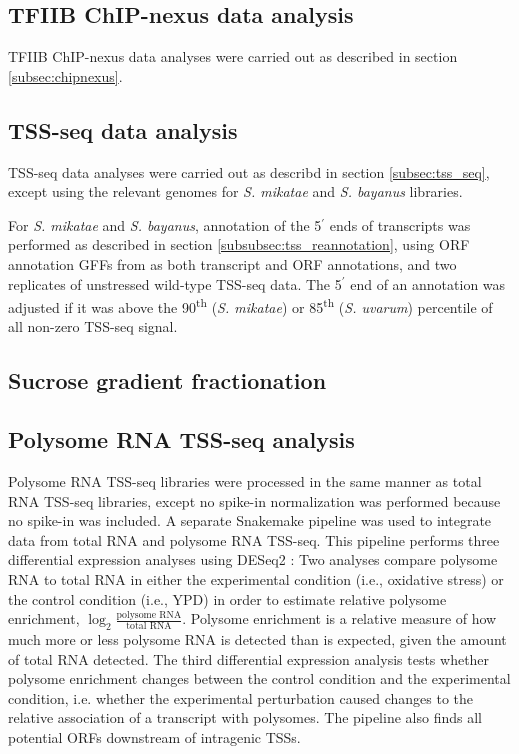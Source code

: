 \subsection{TFIIB ChIP-nexus data analysis}

TFIIB ChIP-nexus data analyses were carried out as described in section \ref{subsec:chipnexus}.

\subsection{TSS-seq data analysis}

TSS-seq data analyses were carried out as describd in section \ref{subsec:tss_seq}, except using the relevant genomes for \textit{S. mikatae} and \textit{S. bayanus} libraries.

For \textit{S. mikatae} and \textit{S. bayanus}, annotation of the 5$^\prime$ ends of transcripts was performed as described in section \ref{subsubsec:tss_reannotation}, using ORF annotation GFFs from \citet{scannell11} as both transcript and ORF annotations, and two replicates of unstressed wild-type TSS-seq data.
The 5$^\prime$ end of an annotation was adjusted if it was above the 90\textsuperscript{th} (\textit{S. mikatae}) or 85\textsuperscript{th} (\textit{S. uvarum}) percentile of all non-zero TSS-seq signal.

\subsection{Sucrose gradient fractionation}

\subsection{Polysome RNA TSS-seq analysis}

Polysome RNA TSS-seq libraries were processed in the same manner as total RNA TSS-seq libraries, except no spike-in normalization was performed because no spike-in was included.
A separate Snakemake pipeline was used to integrate data from total RNA and polysome RNA TSS-seq.
This pipeline performs three differential expression analyses using DESeq2 \citep{love2014}: Two analyses compare polysome RNA to total RNA in either the experimental condition (i.e., oxidative stress) or the control condition (i.e., YPD) in order to estimate relative polysome enrichment, $\log_2 \frac{\text{polysome RNA}}{\text{total RNA}}$.
Polysome enrichment is a relative measure of how much more or less polysome RNA is detected than is expected, given the amount of total RNA detected.
The third differential expression analysis tests whether polysome enrichment changes between the control condition and the experimental condition, i.e. whether the experimental perturbation caused changes to the relative association of a transcript with polysomes.
The pipeline also finds all potential ORFs downstream of intragenic TSSs.

